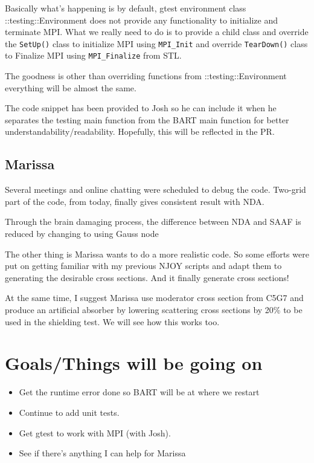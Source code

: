 \documentclass{article}
\begin{document}
Basically what's happening is by default, gtest environment class {::testing::Environment} does 
not provide any functionality to initialize and terminate MPI. What we really need to do is 
to provide a child class and override the {\tt SetUp()} class to initialize MPI using {\tt MPI\_Init} and override {\tt TearDown()}
class to Finalize MPI using {\tt MPI\_Finalize} from STL.

The goodness is other than overriding functions from {::testing::Environment} everything will be almost the same.

The code snippet has been provided to Josh so he can include it when he separates the testing main function
from the BART main function for better understandability/readability. Hopefully, this will be reflected in the PR.

\subsection{Marissa}
Several meetings and online chatting were scheduled to debug the code. Two-grid part of the code, from today,
finally gives consistent result with NDA.

Through the brain damaging process, the difference between NDA and SAAF is reduced by changing to using
Gauss node

The other thing is Marissa wants to do a more realistic code. So some efforts were put on
getting familiar with my previous NJOY scripts and adapt them to generating the desirable 
cross sections. And it finally generate cross sections!

At the same time, I suggest Marissa use
moderator cross section from C5G7 and produce an artificial absorber by lowering
scattering cross sections by 20\% to be used in the shielding test. We will see how this works too.



\section{Goals/Things will be going on}
\begin{itemize}
	\item Get the runtime error done so BART will be at where we restart
	\item Continue to add unit tests.
	\item Get gtest to work with MPI (with Josh).
	\item See if there's anything I can help for Marissa
\end{itemize}
\end{document}

